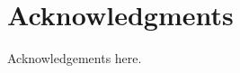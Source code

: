 \thispagestyle{empty}




\chapter{Acknowledgments}
\vspace{1em}

Acknowledgements here.
\cleardoublepage{}

